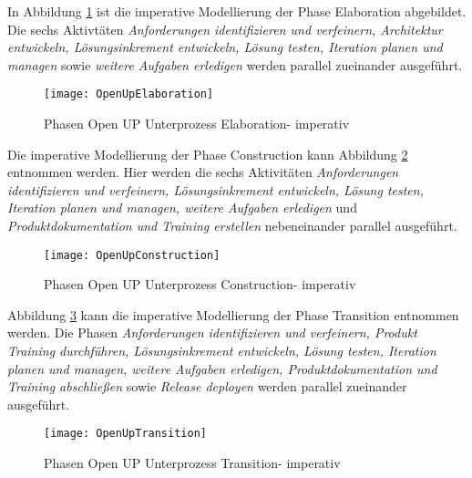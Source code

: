 In Abbildung \ref{fig:OpenUpElaboration} ist die imperative Modellierung der Phase Elaboration abgebildet. Die sechs Aktivtäten \textit{Anforderungen identifizieren und verfeinern, Architektur entwickeln, Lösungsinkrement entwickeln, Lösung testen, Iteration planen und managen} sowie \textit{weitere Aufgaben erledigen} werden parallel zueinander ausgeführt.

\begin{figure}[htp]
\begin{center}
  \texttt{[image: OpenUpElaboration]} %
  \caption{Phasen Open UP Unterprozess Elaboration- imperativ}
  \label{fig:OpenUpElaboration}
\end{center}
\end{figure}

Die imperative Modellierung der Phase Construction kann Abbildung \ref{fig:OpenUpConstruction} entnommen werden. Hier werden die sechs Aktivitäten \textit{Anforderungen identifizieren und verfeinern, Lösungsinkrement entwickeln, Lösung testen, Iteration planen und managen, weitere Aufgaben erledigen} und \textit{Produktdokumentation und Training erstellen} nebeneinander parallel ausgeführt.
\begin{figure}[htp]
\begin{center}
  \texttt{[image: OpenUpConstruction]} %
  \caption{Phasen Open UP Unterprozess Construction- imperativ}
  \label{fig:OpenUpConstruction}
\end{center}
\end{figure}

Abbildung \ref{fig:OpenUpTransition} kann die imperative Modellierung der Phase Transition entnommen werden.\newline
Die Phasen \textit{Anforderungen identifizieren und verfeinern, Produkt Training durchführen, Lösungsinkrement entwickeln, Lösung testen, Iteration planen und managen, weitere Aufgaben erledigen, Produktdokumentation und Training abschließen} sowie \textit{Release deployen} werden parallel zueinander ausgeführt.

\begin{figure}[htp]
\begin{center}
  \texttt{[image: OpenUpTransition]} %
  \caption{Phasen Open UP Unterprozess Transition- imperativ}
  \label{fig:OpenUpTransition}
\end{center}
\end{figure}



